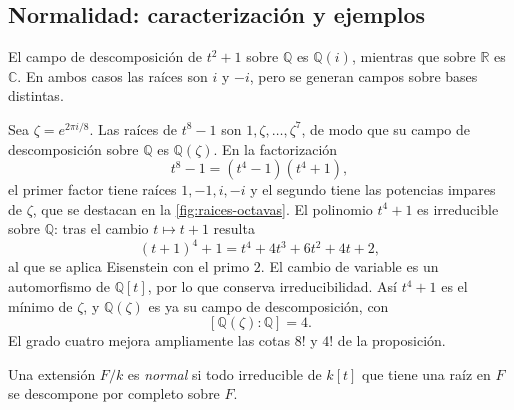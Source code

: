 \subsection{Normalidad: caracterización y ejemplos}\label{tema:24-3-2}\label{tema:25-1-1}\label{tema:25-1-2}
\begin{ejem}
El campo de descomposición de $t^2+1$ sobre $\mathbb Q$ es $\mathbb Q(i)$, mientras que sobre $\mathbb R$ es $\mathbb C$. En ambos casos las raíces son $i$ y $-i$, pero se generan campos sobre bases distintas.
\end{ejem}

\begin{ejem}\label{ejem:C24-octavas}
Sea $\zeta=e^{2\pi i/8}$. Las raíces de $t^8-1$ son $1,\zeta,\ldots,\zeta^7$, de modo que su campo de descomposición sobre $\mathbb Q$ es $\mathbb Q(\zeta)$. En la factorización
\[
t^8-1=(t^4-1)(t^4+1),
\]
el primer factor tiene raíces $1,-1,i,-i$ y el segundo tiene las potencias impares de $\zeta$, que se destacan en la \cref{fig:raices-octavas}.
El polinomio $t^4+1$ es irreducible sobre $\mathbb Q$: tras el cambio $t\mapsto t+1$ resulta
\[
(t+1)^4+1=t^4+4t^3+6t^2+4t+2,
\]
al que se aplica Eisenstein con el primo $2$. El cambio de variable es un automorfismo de $\mathbb Q[t]$, por lo que conserva irreducibilidad. Así $t^4+1$ es el mínimo de $\zeta$, y $\mathbb Q(\zeta)$ es ya su campo de descomposición, con
\[
[\mathbb Q(\zeta):\mathbb Q]=4.
\]
El grado cuatro mejora ampliamente las cotas $8!$ y $4!$ de la proposición.
\end{ejem}

\begin{defi}
Una extensión $F/k$ es \emph{normal} si todo irreducible de $k[t]$ que tiene una raíz en $F$ se descompone por completo sobre $F$.
\end{defi}

